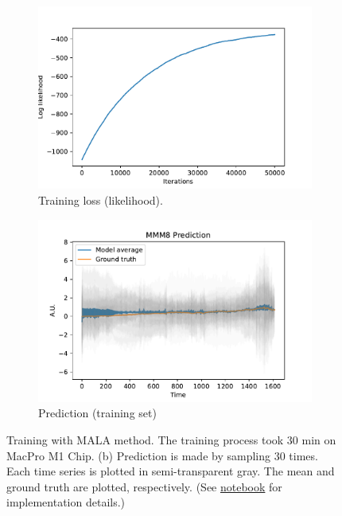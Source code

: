 \documentclass{article}
\begin{document}
\begin{figure}[h]
    \centering
    \begin{subfigure}[b]{0.5\textwidth}
        \centering
        \includegraphics[width=\textwidth]{../img/training_MALA_50000-iter.pdf}
        \caption{Training loss (likelihood).}
        \label{fig:training-log}
    \end{subfigure}%
    \begin{subfigure}[b]{0.5\textwidth}
        \centering
        \includegraphics[width=\textwidth]{../img/prediction_MALA_50000-iter.pdf}
        \caption{Prediction (training set)}
        \label{fig:pred-sub}
    \end{subfigure}
    \caption{Training with MALA method. The training process took $30$ min on MacPro M1 Chip. (b) Prediction is made by sampling $30$ times. Each time series is plotted in semi-transparent gray. The mean and ground truth are plotted, respectively. (See \href{https://github.com/stevengogogo/ECEN649_FinalProject/blob/main/script/EXP_fit_time_window.ipynb}{notebook} for implementation details.)}
    \label{fig:pred}
\end{figure}
\end{document}
